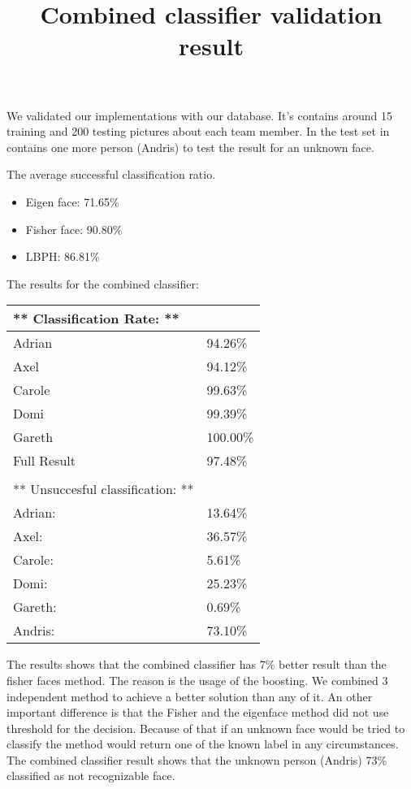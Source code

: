 We validated our implementations with our database. It's contains around 15 training and 200 testing pictures about each team member. In the test set in contains one more person (Andris) to test the result for an unknown face.

The average successful classification ratio.
\begin{itemize}
	\item Eigen face: 71.65\%
	\item Fisher face: 90.80\%
	\item LBPH: 86.81\%
\end{itemize}

The results for the combined classifier:
\begin{table}[h]
	\begin{tabular}{l|l}
		** Classification Rate:                ** &          \\ \hline
		Adrian                                    & 94.26\%  \\
		Axel                                      & 94.12\%  \\
		Carole                                    & 99.63\%  \\
		Domi                                      & 99.39\%  \\
		Gareth                                    & 100.00\% \\ \hline
		Full Result                               & 97.48\%  \\ 
		\\
		** Unsuccesful classification:         ** &          \\ \hline
		Adrian:                                   & 13.64\%  \\
		Axel:                                     & 36.57\%  \\
		Carole:                                   & 5.61\%   \\
		Domi:                                     & 25.23\%  \\
		Gareth:                                   & 0.69\%  \\ \hline
		Andris:                                   & 73.10\%  
	\end{tabular}
	\label{CombinedResult}
	\title{Combined classifier validation result}
\end{table}

The results shows that the combined classifier has 7\% better result than the fisher faces method. The reason is the usage of the boosting. We combined 3 independent method to achieve a better solution than any of it. An other important difference is that the Fisher and the eigenface method did not use threshold for the decision. Because of that if an unknown face would be tried to classify the method would return one of the known label in any circumstances. The combined classifier result shows that the unknown person (Andris) 73\% classified as not recognizable face.